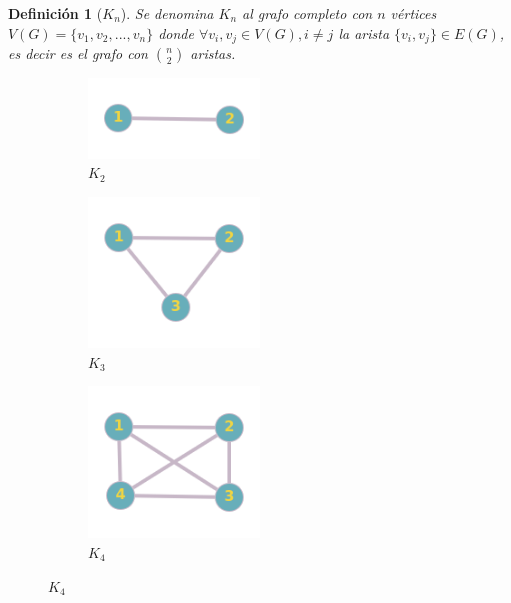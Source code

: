 \documentclass[a4paper,1pt]{report}
\newtheorem*{dfn}{Definición}
\begin{document}
\begin{dfn}[$K_n$]
    Se denomina $K_n$ al grafo completo con $n$ v\'ertices $V(G)= \{v_1, v_2,..., v_n\}$  donde $\forall v_i, v_j \in V(G), i\neq j$ la arista $\{v_i, v_j\} \in E(G)$, es decir es el grafo con $\binom{n}{2}$ aristas.
\end{dfn}

\begin{figure}[H]
    \centering
    \begin{subfigure}[b]{0.22\textwidth}
    \centering
    \includegraphics[width=0.5\textwidth]{figures2/P2.png}
    \caption{$K_2$}
    \end{subfigure}
    \begin{subfigure}[b]{0.22\textwidth}
        \centering
    \includegraphics[width=0.5\textwidth]{figures2/C3.png}
    \caption{$K_3$}
    \end{subfigure}
    \begin{subfigure}[b]{0.22\textwidth}
        \centering
    \includegraphics[width=0.5\textwidth]{figures2/K4.png}
    \caption{$K_4$}

\end{subfigure}
\end{figure}
\end{document}
